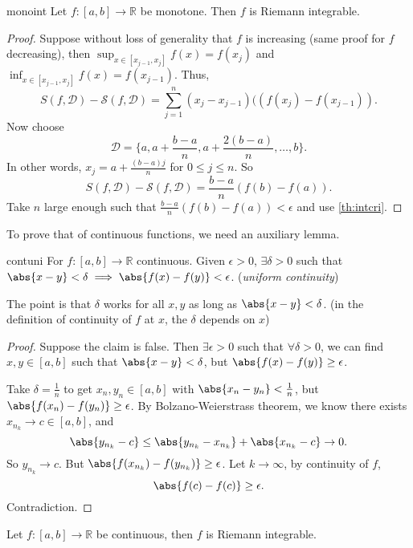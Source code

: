 \begin{theorem}{}{monoint}
    Let \(f: [a,b] \to \mathbb{R}\) be monotone. Then \(f\) is Riemann integrable.
\end{theorem}
\begin{proof}
    Suppose without loss of generality that \(f\) is increasing (same proof for \(f\) decreasing), then \(\sup_{x\in[x_{j-1},x_j]}f(x) = f(x_j)\) and \(\inf_{x\in[x_{j-1},x_j]}f(x) = f(x_{j-1})\). Thus,
    \[
        S(f,\mathcal{D}) - \mathscr{S}(f,\mathcal{D}) = \sum_{j=1}^{n} (x_j - x_{j-1})((f(x_j) - f(x_{j-1})).
    \]
    Now choose
    \[
        \mathcal{D} = \{a, a + \frac{b-a}{n}, a + \frac{2(b-a)}{n} , \dots, b\}.
    \]
    In other words, \(x_j = a + \frac{(b-a)j}{n}\) for \(0 \leq j \leq n\). So
    \[
        S(f, \mathcal{D}) - \mathscr{S}(f, \mathcal{D}) = \frac{b-a}{n}(f(b) - f(a)).
    \]
    Take \(n\) large enough such that \(\frac{b-a}{n}(f(b) - f(a))<\epsilon\) and use \cref{th:intcri}.
\end{proof}
To prove that of continuous functions, we need an auxiliary lemma.
\begin{lemma}{}{contuni}
    For \(f: [a,b] \to \mathbb{R}\) continuous. Given \(\epsilon > 0\), \(\exists \delta> 0\) such that \(\abs{x-y}<\delta \implies \abs{f(x) - f(y)}<\epsilon\). (\textit{uniform continuity})
\end{lemma}
The point is that \(\delta\) works for all \(x, y\) as long as \(\abs{x-y}<\delta\). (in the definition of continuity of \(f\) at \(x\), the \(\delta\) depends on \(x\))
\begin{proof}
    Suppose the claim is false. Then \(\exists \epsilon>0\) such that \(\forall \delta > 0\), we can find \(x, y \in [a,b]\) such that \(\abs{x-y} < \delta\), but \(\abs{f(x) - f(y)} \geq \epsilon\).

    Take \(\delta = \frac{1}{n}\) to get \(x_n, y_n \in [a,b]\) with \(\abs{x_n - y_n} < \frac{1}{n}\), but \(\abs{f(x_n) - f(y_n)} \geq \epsilon\). By Bolzano-Weierstrass theorem, we know there exists \(x_{n_k} \to c \in [a,b]\), and
    \[
        \abs{y_{n_k} - c} \leq \abs{y_{n_k} - x_{n_k}} + \abs{x_{n_k} - c} \to 0.
    \]
    So \(y_{n_k} \to c\). But \(\abs{f(x_{n_k}) - f(y_{n_k})} \geq \epsilon\). Let \(k \to \infty\), by continuity of \(f\),
    \[
        \abs{f(c) - f(c)} \geq \epsilon.
    \]
    Contradiction.
\end{proof}
\begin{theorem}
    Let \(f: [a,b] \to \mathbb{R}\) be continuous, then \(f\) is Riemann integrable.
\end{theorem}
